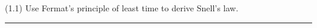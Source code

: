 \documentclass[12pt]{article}
\begin{document}
(1.1)
Use Fermat's principle of least time to derive Snell's law.

\bigskip
\hrule

\bigskip
\end{document}
